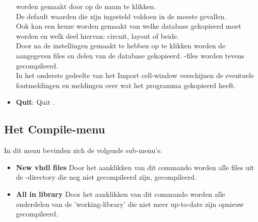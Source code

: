 \begin{itemize}
                  worden gemaakt door op de naam te klikken.\\
                  De default waarden die zijn ingesteld voldoen in de meeste
                  gevallen.\\
                  Ook kan een keuze worden gemaakt van welke  database
                  gekopieerd moet worden en welk deel hiervan: circuit, layout
                  of beide.\\
                  Door na de instellingen gemaakt te hebben op  te
                  klikken worden de aangegeven files en delen van de 
                  database gekopieerd. -files worden tevens gecompileerd.\\
                  In het onderste gedeelte van het Import cell-window verschijnen de
                  eventuele foutmel\-ding\-en en meldingen over wat het
                  programma gekopieerd heeft.
\item {\bf Quit}: Quit .
\end{itemize}

\subsection{Het Compile-menu}
In dit menu bevinden zich de volgende sub-menu's:
\begin{itemize}
\item{\bf New vhdl files}
Door het aanklikken van dit commando worden alle files uit de -directory
die nog niet gecompileerd zijn, gecompileerd.
\item{\bf All in library}
Door het aanklikken van dit commando worden alle onderdelen van de
'working-library' die niet meer up-to-date zijn opnieuw gecompileerd.
\end{itemize}

